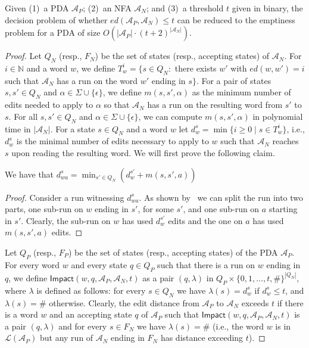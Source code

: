 \documentclass{CSML}
\newcommand{\aut}{\mathcal{A}}
\newcommand{\N}{\mathbb{N}}
\newcommand{\lang}{\mathcal{L}}
\newcommand{\ed}{ed}
\begin{document}
\begin{lem}
Given (1)~a PDA $\aut_P$; (2)~an NFA $\aut_N$; and (3)~a threshold $t$ given in binary, 
the decision problem of whether $\ed(\aut_P,\aut_N)\leq t$ can be reduced to the emptiness problem 
for a PDA of size $O(|\aut_P|\cdot (t+2)^{|\aut_N|})$.
\label{l:EDtoPDAreduction}
\end{lem}
\newcommand{\Impact}{\mathsf{Impact}}
\begin{proof}
\newcommand{\QN}{Q_{N}}
\newcommand{\FN}{F_{N}}
\newcommand{\QP}{Q_{P}}
\newcommand{\FP}{F_{P}}
\newcommand{\SP}{S_{P}}
\newcommand{\SN}{S_{N}}
\newcommand{\autImpact}{{\aut_{I}}}
\newcommand{\lpair}[1]{\langle #1 \rangle}
\newcommand{\deltaI}{\delta_I}
Let $\QN$ (resp., $\FN$) be the set of states (resp., accepting states) of $\aut_N$.
For $i \in \N$ and a word $w$, we define 
$T_w^i = \{ s \in \QN : $ there exists $w'$ with $\ed(w,w') = i$ such that $\aut_N $ has a run on the word $w'$ ending in $s \}$.
For a pair of states $s, s' \in \QN$ and $\alpha \in \Sigma\cup \{\epsilon\}$, we define  $m(s,s',\alpha)$ as the minimum number of edits needed to apply to $\alpha$ 
so that $\aut_N$ has a run on the resulting word from $s'$ to $s$.
For all $s, s' \in \QN$ and $\alpha \in \Sigma\cup \{\epsilon\}$, we
can compute $m(s,s',\alpha)$ in polynomial time in $|\aut_N|$.
For a state $s \in \QN$ and a word $w$ let $d_{w}^s=\min \{ i \geq 0 \mid s\in T_w^i \}$, i.e., $d_w^s$ is the minimal number of edits necessary 
to apply to $w$ such that $\aut_N$ reaches $s$  upon reading the resulting word.
We will  first prove the following claim.

\begin{clm}\label{cla:letter-by-letter}We have that $d_{w a}^s=\min_{s' \in \QN}(d_{w}^{s'}+m(s,s',a))$\end{clm}
\begin{proof}
Consider a run witnessing $d_{w a}^s$.
 As shown by~\cite{WF74} we can split the run into two parts, one sub-run on $w$ ending in $s'$, for some $s'$, and one sub-run on $a$ starting in $s'$. Clearly, the sub-run on $w$ has used $d_{w}^{s'}$ edits and the one on $a$ has used $m(s,s',a)$ edits.
\end{proof}


Let $\QP$ (resp., $\FP$) be the set of states (resp., accepting states) of the PDA $\aut_P$.
For every word $w$ and every state $q \in \QP$ such that there is a run on $w$ ending in $q$, we define 
$\Impact(w,q,\aut_P,\aut_N,t)$ as a pair 
$(q,\lambda)$ in $\QP \times \{0,1,\dots, t,\#\}^{|\QN|}$, where $\lambda$ is defined as follows:
for every $s \in \QN$ we have $\lambda(s) = d_w^{s}$ if $d_w^{s}\leq t$, and 
$\lambda(s) = \#$ otherwise. 
Clearly, the edit distance from $\aut_P$ to $\aut_N$ exceeds $t$ if there is a 
word $w$ and an accepting state $q$ of $\aut_P$ such that $\Impact(w,q,\aut_P,\aut_N,t)$ is a pair $(q,\lambda)$
and for every $s \in \FN$ we have $\lambda(s) = \#$
(i.e., the word $w$ is in $\lang(\aut_P)$ but any run of $\aut_N$ ending in $\FN$ has distance exceeding $t$).
 

\end{proof}
\end{document}
